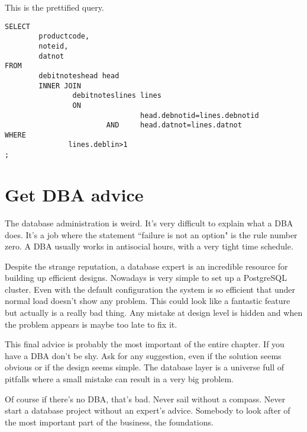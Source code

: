 This is the prettified query.

\begin{lstlisting}[style=pgsql]
SELECT
        productcode,
        noteid,
        datnot
FROM
        debitnoteshead head
        INNER JOIN
                debitnoteslines lines
                ON
                                head.debnotid=lines.debnotid
                        AND     head.datnot=lines.datnot
WHERE
               lines.deblin>1
;
\end{lstlisting}


\section{Get DBA advice}
\label{sec:GETDBA}
The database administration is weird. It's very difficult to explain what a DBA does. It's a job
where the statement ``failure is not an option" is the rule number zero. A DBA usually works in
antisocial hours, with a very tight time schedule.\newline

Despite the strange reputation, a database expert is an incredible resource for building up
efficient designs. Nowadays is very simple to set up a PostgreSQL cluster. Even with the default 
configuration the system is so efficient that under normal load doesn't show any problem. This could look 
like a fantastic feature but actually is a really bad thing. Any mistake at design level is hidden and when 
the problem appears is maybe too late to fix it.\newline

This final advice is probably the most important of the entire chapter. If you have a DBA don't be
shy. Ask for any suggestion, even if the solution seems obvious or if the design seems simple. The
database layer is a universe full of pitfalls where a small mistake can result in a very big 
problem.\newline

Of course if there's no DBA, that's bad. Never sail without a compass. Never start a database
project without an expert's advice. Somebody to look after of the most important part of the business, the
foundations.\newline


